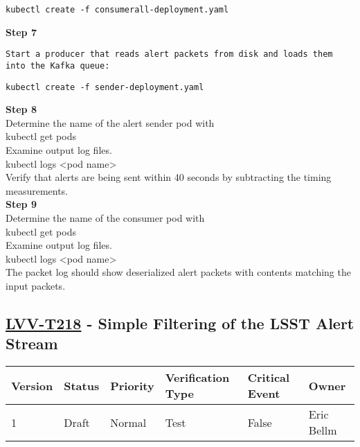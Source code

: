 \begin{verbatim}
kubectl create -f consumerall-deployment.yaml
\end{verbatim}

\textbf{Step 7}\\

\begin{verbatim}
Start a producer that reads alert packets from disk and loads them into the Kafka queue:
\end{verbatim}

\begin{verbatim}
kubectl create -f sender-deployment.yaml
\end{verbatim}

\textbf{Step 8}\\
Determine the name of the alert sender pod with\\[2\baselineskip]kubectl
get pods\\[2\baselineskip]Examine output log
files.\\[2\baselineskip]kubectl logs \textless{}pod
name\textgreater{}\\[2\baselineskip]Verify that alerts are being sent
within 40 seconds by subtracting the timing
measurements.\\[2\baselineskip]\textbf{Step 9}\\
Determine the name of the consumer pod with\\[2\baselineskip]kubectl get
pods\\[2\baselineskip]Examine output log files.\\[2\baselineskip]kubectl
logs \textless{}pod name\textgreater{}\\[2\baselineskip]The packet log
should show deserialized alert packets with contents matching the input
packets.\\[4\baselineskip]

\hypertarget{lvv-t218---simple-filtering-of-the-lsst-alert-stream}{\subsection{\texorpdfstring{\href{https://jira.lsstcorp.org/secure/Tests.jspa\#/testCase/LVV-T218}{LVV-T218}
- Simple Filtering of the LSST Alert
Stream}{LVV-T218 - Simple Filtering of the LSST Alert Stream}}\label{lvv-t218---simple-filtering-of-the-lsst-alert-stream}}

\begin{longtable}[]{@{}llllll@{}}
\toprule
Version & Status & Priority & Verification Type & Critical Event &
Owner\tabularnewline
\midrule
\endhead
1 & Draft & Normal & Test & False & Eric Bellm\tabularnewline
\bottomrule
\end{longtable}

